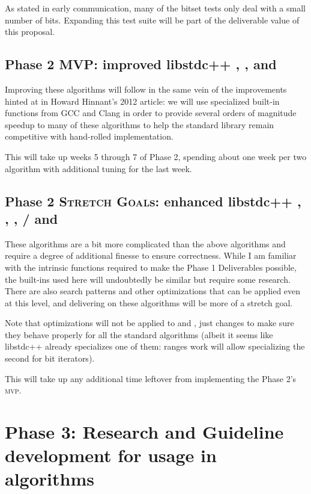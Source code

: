 \documentclass{wg21}
\begin{document}
As stated in early communication\cite{bit_proposal_libstdc++_initial_mailing}, many of the bitset tests only deal with a small number of bits. Expanding this test suite will be part of the deliverable value of this proposal.

\subsection{Phase 2 \textsc{MVP}: improved libstdc++ , ,  and }

Improving these algorithms will follow in the same vein of the improvements hinted at in Howard Hinnant's 2012 article: we will use specialized built-in functions from GCC and Clang in order to provide several orders of magnitude speedup to many of these algorithms to help the standard library remain competitive with hand-rolled implementation.

This will take up weeks 5 through 7 of Phase 2, spending about one week per two algorithm with additional tuning for the last week.

\subsection{Phase 2 \textsc{Stretch Goal}s: enhanced libstdc++ , , , / and }

These algorithms are a bit more complicated than the above algorithms and require a degree of additional finesse to ensure correctness. While I am familiar with the intrinsic functions required to make the Phase 1 Deliverables possible, the built-ins used here will undoubtedly be similar but require some research. There are also search patterns and other optimizations that can be applied even at this level, and delivering on these algorithms will be more of a stretch goal.

Note that optimizations will not be applied to  and , just changes to make sure they behave properly for all the standard algorithms (albeit it seems like libstdc++ already specializes one of them: ranges work will allow specializing the second for bit iterators).

This will take up any additional time leftover from implementing the Phase 2's \textsc{mvp}.


\section[phase3]{Phase 3: Research and Guideline development for  usage in algorithms}
\end{document}
